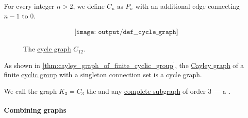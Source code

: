 \begin{definition}\label{def:cycle_graph}
  For every integer \( n > 2 \), we define  \( C_n \) as \hyperref[def:path_graph]{\( P_n \)} with an additional edge connecting \( n - 1 \) to \( 0 \).

  \begin{figure}[!ht]
    \begin{equation}\label{eq:fig:def:cycle_graph/c12}
      \begin{aligned}
        \texttt{[image: output/def\_\_cycle\_graph]}
      \end{aligned}
    \end{equation}
    \caption{The \hyperref[def:cycle_graph]{cycle graph} \( C_{12} \).}\label{fig:def:cycle_graph/c12}
  \end{figure}
\end{definition}
\begin{comments}
  \item As shown in \cref{thm:cayley_graph_of_finite_cyclic_group}, the \hyperref[def:cayley_graph]{Cayley graph} of a finite \hyperref[def:cyclic_group]{cyclic group} with a singleton connection set is a cycle graph.
\end{comments}

\begin{definition}\label{def:triangle_graph}
  We call the graph \( K_3 = C_3 \) the  and any \hyperref[def:complete_subgraph]{complete subgraph} of order \( 3 \) --- a .
\end{definition}

\paragraph{Combining graphs}


